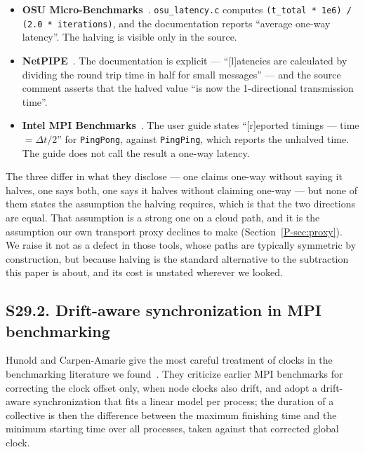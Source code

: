 \documentclass[10pt,journal,onecolumn]{IEEEtran}
\newcommand{\mainModel}{\ref{P-sec:proxy}}           %
\begin{document}
\begin{itemize}
\item \textbf{OSU Micro-Benchmarks}~\cite{osu_microbenchmarks}. \texttt{osu\_latency.c}
      computes \texttt{(t\_total * 1e6) / (2.0 * iterations)}, and the documentation reports
      ``average one-way latency''. The halving is visible only in the source.
\item \textbf{NetPIPE}~\cite{netpipe}. The documentation is explicit --- ``[l]atencies are
      calculated by dividing the round trip time in half for small messages'' --- and the
      source comment asserts that the halved value ``is now the 1-directional transmission
      time''.
\item \textbf{Intel MPI Benchmarks}~\cite{intel_imb}. The user guide states ``[r]eported
      timings --- time${}=\Delta t/2$'' for \texttt{PingPong}, against \texttt{PingPing},
      which reports the unhalved time. The guide does not call the result a one-way latency.
\end{itemize}

The three differ in what they disclose --- one claims one-way without saying it halves, one
says both, one says it halves without claiming one-way --- but none of them states the
assumption the halving requires, which is that the two directions are equal. That assumption
is a strong one on a cloud path, and it is the assumption our own transport proxy declines to
make (Section~\mainModel{}). We raise it not as a defect in those tools, whose paths are typically
symmetric by construction, but because halving is the standard alternative to the
subtraction this paper is about, and its cost is unstated wherever we looked.

\subsection{S29.2. Drift-aware synchronization in MPI benchmarking}

Hunold and Carpen-Amarie give the most careful treatment of clocks in the benchmarking
literature we found~\cite{hunold2016reproducible}. They criticize earlier MPI benchmarks for
correcting the clock offset only, when node clocks also drift, and adopt a drift-aware
synchronization that fits a linear model per process; the duration of a collective is then
the difference between the maximum finishing time and the minimum starting time over all
processes, taken against that corrected global clock.
\end{document}
